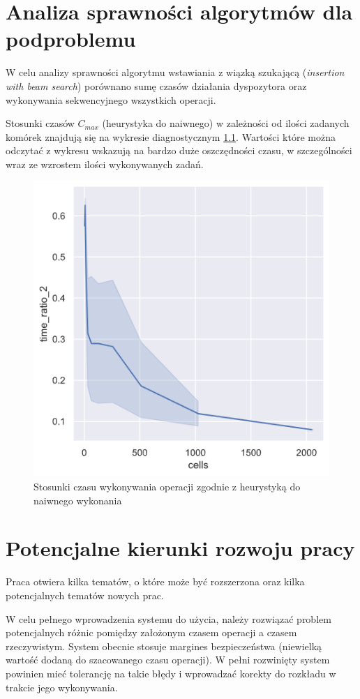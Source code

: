 \documentclass[brudnopis]{xmgr}
\begin{document}
\chapter{Analiza sprawności algorytmów dla podproblemu}

W celu analizy sprawności algorytmu wstawiania z wiązką szukającą (\emph{insertion with beam search}) porównano sumę czasów działania dyspozytora oraz wykonywania sekwencyjnego wszystkich operacji.

Stosunki czasów $C_{max}$ (heurystyka do naiwnego) w zależności od ilości zadanych komórek znajdują się na wykresie diagnostycznym \ref{diag:time_ratio_2}. Wartości które można odczytać z wykresu wskazują na bardzo duże oszczędności czasu, w szczególności wraz ze wzrostem ilości wykonywanych zadań.

\begin{figure}[!tbh]
\centering
\includegraphics[width=.7\hsize]{fig/time_ratio_2.png}
\caption{Stosunki czasu wykonywania operacji zgodnie z heurystyką do naiwnego wykonania \label{diag:time_ratio_2}}
\end{figure}\medskip

\chapter{Potencjalne kierunki rozwoju pracy} \label{chap:extend}

Praca otwiera kilka tematów, o które może być rozszerzona oraz kilka potencjalnych tematów nowych prac.
\medskip

W celu pełnego wprowadzenia systemu do użycia, należy rozwiązać problem potencjalnych różnic pomiędzy założonym czasem operacji a czasem rzeczywistym. System obecnie stosuje margines bezpieczeństwa (niewielką wartość dodaną do szacowanego czasu operacji).
W pełni rozwinięty system powinien mieć tolerancję na takie błędy i wprowadzać korekty do rozkładu w trakcie jego wykonywania.
\medskip
\end{document}
